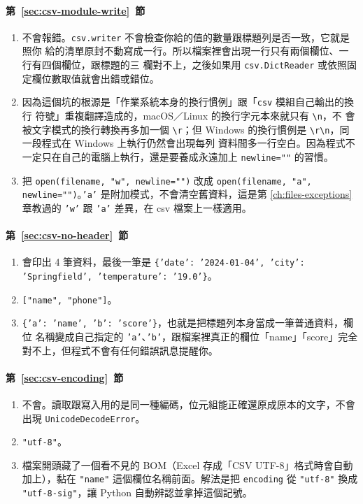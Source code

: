 \paragraph{第~\ref{sec:csv-module-write}~節}
\begin{enumerate}
\item 不會報錯。\texttt{csv.writer} 不會檢查你給的值的數量跟標題列是否一致，它就是照你
給的清單原封不動寫成一行。所以檔案裡會出現一行只有兩個欄位、一行有四個欄位，跟標題的三
欄對不上，之後如果用 \texttt{csv.DictReader} 或依照固定欄位數取值就會出錯或錯位。
\item 因為這個坑的根源是「作業系統本身的換行慣例」跟「\texttt{csv} 模組自己輸出的換行
符號」重複翻譯造成的，macOS／Linux 的換行字元本來就只有 \texttt{\textbackslash n}，不
會被文字模式的換行轉換再多加一個 \texttt{\textbackslash r}；但 Windows 的換行慣例是
\texttt{\textbackslash r\textbackslash n}，同一段程式在 Windows 上執行仍然會出現每列
資料間多一行空白。因為程式不一定只在自己的電腦上執行，還是要養成永遠加上
\texttt{newline=""} 的習慣。
\item 把 \texttt{open(filename, "w", newline="")} 改成 \texttt{open(filename, "a",
newline="")}。\texttt{'a'} 是附加模式，不會清空舊資料，這是第 \ref{ch:files-exceptions} 章教過的
\texttt{'w'} 跟 \texttt{'a'} 差異，在 csv 檔案上一樣適用。
\end{enumerate}

\paragraph{第~\ref{sec:csv-no-header}~節}
\begin{enumerate}
\item 會印出 4 筆資料，最後一筆是
\texttt{\{'date': '2024-01-04', 'city': 'Springfield', 'temperature': '19.0'\}}。
\item \texttt{["name", "phone"]}。
\item \texttt{\{'a': 'name', 'b': 'score'\}}，也就是把標題列本身當成一筆普通資料，欄位
名稱變成自己指定的 \texttt{'a'}、\texttt{'b'}，跟檔案裡真正的欄位「name」「score」完全
對不上，但程式不會有任何錯誤訊息提醒你。
\end{enumerate}

\paragraph{第~\ref{sec:csv-encoding}~節}
\begin{enumerate}
\item 不會。讀取跟寫入用的是同一種編碼，位元組能正確還原成原本的文字，不會出現
\texttt{UnicodeDecodeError}。
\item \texttt{"utf-8"}。
\item 檔案開頭藏了一個看不見的 BOM（Excel 存成「CSV UTF-8」格式時會自動加上），黏在
\texttt{"name"} 這個欄位名稱前面。解法是把 \texttt{encoding} 從 \texttt{"utf-8"} 換成
\texttt{"utf-8-sig"}，讓 Python 自動辨認並拿掉這個記號。
\end{enumerate}

